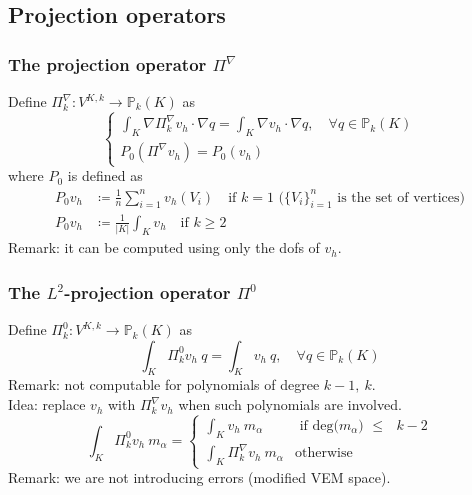 \documentclass[10pt]{beamer}
\begin{document}
	\subsection{Projection operators}
	\begin{frame}\frametitle{The projection operator $\Pi^\nabla$}
Define $\Pi_k^\nabla : V^{K,k} \rightarrow \mathbb{P}_k(K)$ as
\begin{equation*}
\begin{cases}
	\int_K \nabla \Pi_k^\nabla v_h \cdot \nabla q = \int_K \nabla v_h \cdot \nabla q, \quad \forall q \in \mathbb{P}_k(K) \\
	P_0(\Pi^\nabla v_h) = P_0(v_h)
\end{cases}
\label{eqn:pi_nabla}
\end{equation*}
where $P_0$ is defined as
	\begin{align*}
	P_0 v_h &\coloneqq \frac{1}{n} \sum_{i=1}^{n} v_h(V_i) \quad \text{if $k=1$ ($\lbrace V_i \rbrace_{i=1}^n$ is the set of vertices)} 
	\\
	P_0 v_h &\coloneqq \frac{1}{|K|} \int_{K} v_h \quad \text{if $k\geq 2$} 
	\end{align*}
Remark: it can be computed using only the dofs of $v_h$. 
	\end{frame}
	
	\begin{frame}\frametitle{The $L^2$-projection operator $\Pi^0$}
Define $\Pi^0_k: V^{K,k} \rightarrow \mathbb{P}_k(K)$ as
\begin{equation*}
\int_K \Pi_k^0 v_h \ q = \int_K v_h \ q, \quad \forall q \in \mathbb{P}_k(K)
\label{eqn:pi_0}
\end{equation*}
Remark: not computable for polynomials of degree $k-1, \ k$. \\
Idea: replace $v_h$ with $\Pi_k^\nabla v_h$ when such polynomials are involved. \\ 
\begin{equation*}
\int_K \Pi_k^0 v_h \ m_\alpha = 
\begin{cases}
\int_K v_h \ m_\alpha &\mbox{ if deg($m_\alpha$) $\leq$ $k-2$} \\
\int_K \Pi_k^\nabla v_h \ m_\alpha &\mbox{otherwise}
\end{cases}
\end{equation*}
Remark: we are not introducing errors (modified VEM space).
	\end{frame}
	
\end{document}
